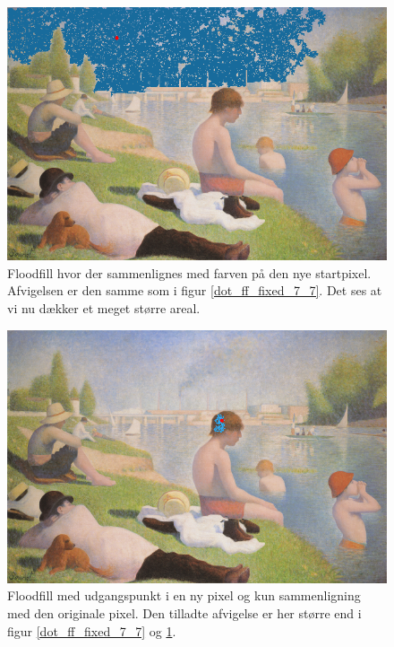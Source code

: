 {\begin{figure}[!h]
    \begin{center}
        \includegraphics[scale=0.49]{afsnit/vores_implementation/billeder/flood_fill/dot_ff_var_7_7}
    \end{center}
    \caption[]{Floodfill hvor der sammenlignes med farven på den nye
    startpixel. Afvigelsen er den samme som i figur
    \ref{dot_ff_fixed_7_7}. Det ses at vi nu dækker et meget større
    areal.}
    \label{dot_ff_var_7_7}
\end{figure}

\begin{figure}[!h]
    \begin{center}
        \includegraphics[scale=0.49]{afsnit/vores_implementation/billeder/flood_fill/dot_ff_fixed_10_10}
    \end{center}
    \caption[]{Floodfill med udgangspunkt i en ny pixel og kun
    sammenligning med den originale pixel. Den tilladte afvigelse er her
    større end i figur \ref{dot_ff_fixed_7_7} og \ref{dot_ff_var_7_7}.}
    \label{dot_ff_fixed_10_10}
\end{figure}

}
